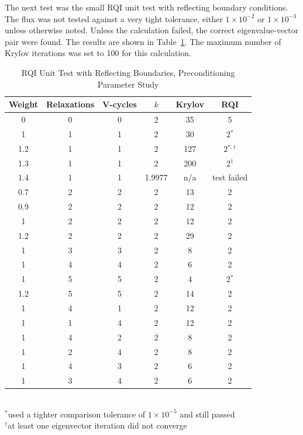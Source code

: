 The next test was the small RQI unit test with reflecting boundary conditions. The flux was not tested against a very tight tolerance, either $1 \times 10^{-2}$ or $1 \times 10^{-3}$ unless otherwise noted. Unless the calculation failed, the correct eigenvalue-vector pair were found. The results are shown in Table~\ref{table:RQIUnitTestRefl}. The maximum number of Krylov iterations was set to 100 for this calculation.
%
\begin{table}[!h]
\caption{RQI Unit Test with Reflecting Boundaries, Preconditioning Parameter Study}
\begin{center}
\begin{tabular}{| c | c | c | c | c | c |}
\hline
Weight & Relaxations & V-cycles & $k$ & Krylov & RQI \\[0.5ex]
\hline
0    & 0 & 0 & 2 & 35   & 5 \\
1    & 1 & 1 & 2 & 30   & 2$^{*}$ \\
1.2 & 1 & 1 & 2 & 127 & 2$^{*,\dag}$ \\
1.3 & 1 & 1 & 2 & 200 & 2$^{\dag}$ \\
1.4 & 1 & 1 & 1.9977  & n/a & test failed \\
\hline
0.7 & 2 & 2 & 2 & 13   & 2 \\
0.9 & 2 & 2 & 2 & 12   & 2 \\
1    & 2 & 2 & 2 & 12   & 2 \\
1.2 & 2 & 2 & 2 & 29   & 2 \\
\hline
1    & 3 & 3 & 2 & 8     & 2 \\
1    & 4 & 4 & 2 & 6     & 2 \\
1    & 5 & 5 & 2 & 4     & 2$^{*}$ \\
1.2 & 5 & 5 & 2 & 14   & 2 \\
\hline
1    & 4 & 1 & 2 & 12   & 2 \\
1    & 1 & 4 & 2 & 12   & 2 \\
1    & 4 & 2 & 2 & 8     & 2 \\
1    & 2 & 4 & 2 & 8     & 2 \\
1    & 4 & 3 & 2 & 6     & 2 \\
1    & 3 & 4 & 2 & 6     & 2 \\
\hline 
\end{tabular}\\
$^{*}$used a tighter comparison tolerance of $1 \times 10^{-5}$ and still passed\\
$^{\dag}$at least one eigenvector iteration did not converge
\end{center}
\label{table:RQIUnitTestRefl}
\end{table}

